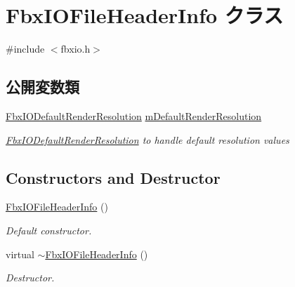 \hypertarget{class_fbx_i_o_file_header_info}{}\section{Fbx\+I\+O\+File\+Header\+Info クラス}
\label{class_fbx_i_o_file_header_info}


{\ttfamily \#include $<$fbxio.\+h$>$}

\subsection*{公開変数類}
\begin{DoxyCompactItemize}
\item 
\hyperlink{class_fbx_i_o_default_render_resolution}{Fbx\+I\+O\+Default\+Render\+Resolution} \hyperlink{class_fbx_i_o_file_header_info_a996d676f069d3d35ca2c68d8b77f5273}{m\+Default\+Render\+Resolution}
\begin{DoxyCompactList}\small\item\em \hyperlink{class_fbx_i_o_default_render_resolution}{Fbx\+I\+O\+Default\+Render\+Resolution} to handle default resolution values \end{DoxyCompactList}\end{DoxyCompactItemize}
\subsection*{Constructors and Destructor}
\begin{DoxyCompactItemize}
\item 
\hyperlink{class_fbx_i_o_file_header_info_ad7f29ce7d02e6f796c7aa813caee7a11}{Fbx\+I\+O\+File\+Header\+Info} ()
\begin{DoxyCompactList}\small\item\em Default constructor. \end{DoxyCompactList}\item 
virtual \hyperlink{class_fbx_i_o_file_header_info_af30c4a1aaae40af02a7518cadb9253f9}{$\sim$\+Fbx\+I\+O\+File\+Header\+Info} ()
\begin{DoxyCompactList}\small\item\em Destructor. \end{DoxyCompactList}\end{DoxyCompactItemize}
